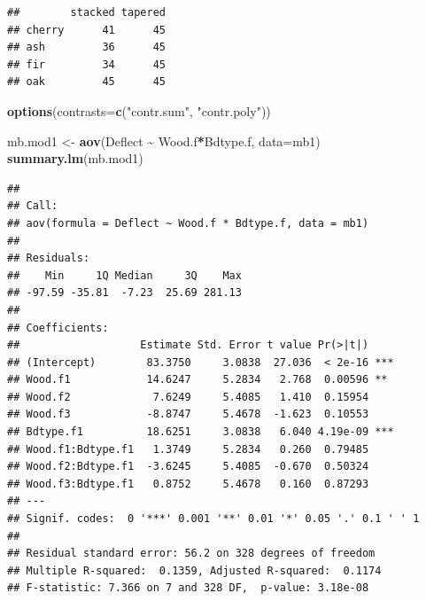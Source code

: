 \documentclass[
]{book}
\newenvironment{Shaded}{\begin{snugshade}}{\end{snugshade}}
\newcommand{\AttributeTok}[1]{\textcolor[rgb]{0.13,0.29,0.53}{#1}}
\newcommand{\FunctionTok}[1]{\textcolor[rgb]{0.13,0.29,0.53}{\textbf{#1}}}
\newcommand{\NormalTok}[1]{#1}
\newcommand{\OtherTok}[1]{\textcolor[rgb]{0.56,0.35,0.01}{#1}}
\newcommand{\SpecialCharTok}[1]{\textcolor[rgb]{0.81,0.36,0.00}{\textbf{#1}}}
\newcommand{\StringTok}[1]{\textcolor[rgb]{0.31,0.60,0.02}{#1}}
\begin{document}
\begin{Shaded}
\end{Shaded}

\begin{verbatim}
##        stacked tapered
## cherry      41      45
## ash         36      45
## fir         34      45
## oak         45      45
\end{verbatim}

\begin{Shaded}
\begin{Highlighting}[]
\FunctionTok{options}\NormalTok{(}\AttributeTok{contrasts=}\FunctionTok{c}\NormalTok{(}\StringTok{"contr.sum"}\NormalTok{, }\StringTok{"contr.poly"}\NormalTok{))}

\NormalTok{mb.mod1 }\OtherTok{\textless{}{-}} \FunctionTok{aov}\NormalTok{(Deflect }\SpecialCharTok{\textasciitilde{}}\NormalTok{ Wood.f}\SpecialCharTok{*}\NormalTok{Bdtype.f, }\AttributeTok{data=}\NormalTok{mb1)}
\FunctionTok{summary.lm}\NormalTok{(mb.mod1)}
\end{Highlighting}
\end{Shaded}

\begin{verbatim}
## 
## Call:
## aov(formula = Deflect ~ Wood.f * Bdtype.f, data = mb1)
## 
## Residuals:
##    Min     1Q Median     3Q    Max 
## -97.59 -35.81  -7.23  25.69 281.13 
## 
## Coefficients:
##                   Estimate Std. Error t value Pr(>|t|)    
## (Intercept)        83.3750     3.0838  27.036  < 2e-16 ***
## Wood.f1            14.6247     5.2834   2.768  0.00596 ** 
## Wood.f2             7.6249     5.4085   1.410  0.15954    
## Wood.f3            -8.8747     5.4678  -1.623  0.10553    
## Bdtype.f1          18.6251     3.0838   6.040 4.19e-09 ***
## Wood.f1:Bdtype.f1   1.3749     5.2834   0.260  0.79485    
## Wood.f2:Bdtype.f1  -3.6245     5.4085  -0.670  0.50324    
## Wood.f3:Bdtype.f1   0.8752     5.4678   0.160  0.87293    
## ---
## Signif. codes:  0 '***' 0.001 '**' 0.01 '*' 0.05 '.' 0.1 ' ' 1
## 
## Residual standard error: 56.2 on 328 degrees of freedom
## Multiple R-squared:  0.1359, Adjusted R-squared:  0.1174 
## F-statistic: 7.366 on 7 and 328 DF,  p-value: 3.18e-08
\end{verbatim}
\end{document}
